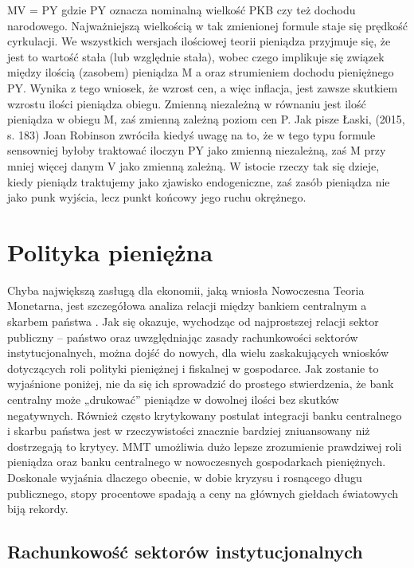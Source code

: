 \documentclass[
]{book}
\begin{document}
MV = PY
gdzie PY oznacza nominalną wielkość PKB czy też dochodu narodowego. Najważniejszą wielkością w tak zmienionej formule staje się prędkość cyrkulacji. We wszystkich wersjach ilościowej teorii pieniądza przyjmuje się, że jest to wartość stała (lub względnie stała), wobec czego implikuje się związek między ilością (zasobem) pieniądza M a oraz strumieniem dochodu pieniężnego PY. Wynika z tego wniosek, że wzrost cen, a więc inflacja, jest zawsze skutkiem wzrostu ilości pieniądza obiegu. Zmienną niezależną w równaniu jest ilość pieniądza w obiegu M, zaś zmienną zależną poziom cen P. Jak pisze Łaski, (2015, s. 183) Joan Robinson zwróciła kiedyś uwagę na to, że w tego typu formule sensowniej byłoby traktować iloczyn PY jako zmienną niezależną, zaś M przy mniej więcej danym V jako zmienną zależną. W istocie rzeczy tak się dzieje, kiedy pieniądz traktujemy jako zjawisko endogeniczne, zaś zasób pieniądza nie jako punk wyjścia, lecz punkt końcowy jego ruchu okrężnego.

\hypertarget{polityka-pieniux119ux17cna}{%
\chapter{Polityka pieniężna}\label{polityka-pieniux119ux17cna}}

Chyba największą zasługą dla ekonomii, jaką wniosła Nowoczesna Teoria Monetarna, jest szczegółowa analiza relacji między bankiem centralnym a skarbem państwa \citep{lavoie_monetary_2013}. Jak się okazuje, wychodząc od najprostszej relacji sektor publiczny -- państwo oraz uwzględniając zasady rachunkowości sektorów instytucjonalnych, można dojść do nowych, dla wielu zaskakujących wniosków dotyczących roli polityki pieniężnej i fiskalnej w gospodarce. Jak zostanie to wyjaśnione poniżej, nie da się ich sprowadzić do prostego stwierdzenia, że bank centralny może „drukować'' pieniądze w dowolnej ilości bez skutków negatywnych. Również często krytykowany postulat integracji banku centralnego i skarbu państwa jest w rzeczywistości znacznie bardziej zniuansowany niż dostrzegają to krytycy. MMT umożliwia dużo lepsze zrozumienie prawdziwej roli pieniądza oraz banku centralnego w nowoczesnych gospodarkach pieniężnych. Doskonale wyjaśnia dlaczego obecnie, w dobie kryzysu i rosnącego długu publicznego, stopy procentowe spadają a ceny na głównych giełdach światowych biją rekordy.

\hypertarget{rachunkowoux15bux107-sektoruxf3w-instytucjonalnych}{%
\section{Rachunkowość sektorów instytucjonalnych}\label{rachunkowoux15bux107-sektoruxf3w-instytucjonalnych}}
\end{document}
